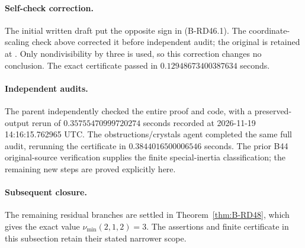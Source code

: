 \paragraph{Self-check correction.}
The initial written draft put the opposite sign in (B-RD46.1).
The coordinate-scaling check above corrected it before independent
audit; the original is retained at
.
Only nondivisibility by three is used, so this correction changes
no conclusion. The exact certificate passed in
$0.12948673400387634$ seconds.

\paragraph{Independent audits.}
The parent independently checked the entire proof and code, with a
preserved-output rerun of $0.35755470999720274$ seconds recorded
at 2026-11-19 14:16:15.762965 UTC. The obstructions/crystals agent
completed the same full audit, rerunning the certificate in
$0.3844016500006546$ seconds. The prior B44 original-source
verification supplies the finite special-inertia classification;
the remaining new steps are proved explicitly here.

\paragraph{Subsequent closure.}
The remaining residual branches are settled in
Theorem~\ref{thm:B-RD48}, which gives the exact value
$\nu_{\min}(2,1,2)=3$. The assertions and finite certificate
in this subsection retain their stated narrower scope.
